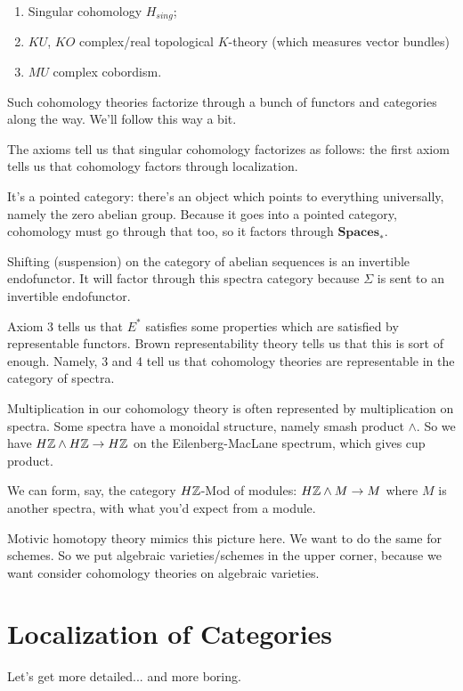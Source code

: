 \documentclass[class=report, crop=false,a4paper,twoside]{standalone}
\begin{document}
\begin{example}
	\begin{enumerate}
		\item Singular cohomology $H_{sing}$;
		\item $KU$, $KO$ complex/real topological $K$-theory (which measures vector bundles)
		\item $MU$ complex cobordism.
	\end{enumerate}
\end{example}

Such cohomology theories factorize through a bunch of functors and categories along the way. We'll follow this way a bit.

The axioms tell us that singular cohomology factorizes as follows: the first axiom tells us that cohomology factors through localization. 

It's a pointed category: there's an object which points to everything universally, namely the zero abelian group. Because it goes into a pointed category, cohomology must go through that too, so it factors through $\mathbf{Spaces}_*$. 

Shifting (suspension) on the category of abelian sequences is an invertible endofunctor. It will factor through this spectra category because $\Sigma$ is sent to an invertible endofunctor. 

Axiom 3 tells us that $E^*$ satisfies some properties which are satisfied by representable functors. Brown representability theory tells us that this is sort of enough. Namely, 3 and 4 tell us that cohomology theories are representable in the category of spectra.

Multiplication in our cohomology theory is often represented by multiplication on spectra. Some spectra have a monoidal structure, namely smash product $\wedge$. So we have $H\mathbb{Z} \wedge H\mathbb{Z} \to H\mathbb{Z}$ on the Eilenberg-MacLane spectrum, which gives cup product.

We can form, say, the category $H\mathbb{Z}$-Mod of modules: $H\mathbb{Z} \wedge M \to M$ where $M$ is another spectra, with what you'd expect from a module.

Motivic homotopy theory mimics this picture here. We want to do the same for schemes. So we put algebraic varieties/schemes in the upper corner, because we want consider cohomology theories on algebraic varieties.

\section{Localization of Categories}
Let's get more detailed... and more boring.
\end{document}
